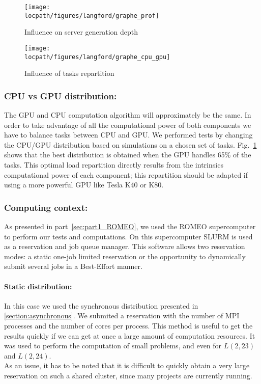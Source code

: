 \begin{figure}[htb]
\begin{minipage}[b]{0.5\linewidth}

\centering 
\texttt{[image: \\locpath/figures/langford/graphe\_prof]}
\caption{Influence on server generation depth}
\label{fig:graphe_prof}

\end{minipage}
\begin{minipage}[b]{0.5\linewidth}

\centering
\texttt{[image: \\locpath/figures/langford/graphe\_cpu\_gpu]}
\caption{Influence of tasks repartition}
\label{fig:graphe_rep}

\end{minipage}
\end{figure}

\subsubsection{CPU vs GPU distribution: }
The GPU and CPU computation algorithm will approximately be the same. 
In order to take advantage of all the computational power of both components we have to balance tasks between CPU and GPU. 
We performed tests by changing the CPU/GPU distribution based on simulations on a chosen set of tasks.  
Fig.~\ref{fig:graphe_rep} shows that the best distribution is obtained when the GPU handles 65\% of the tasks. 
This optimal load repartition directly results from the intrinsics computational power of each component; this repartition should be adapted if using a more powerful GPU like Tesla K40 or K80.

\subsubsection{Computing context: }

As presented in part~\ref{sec:part1_ROMEO}, we used the ROMEO supercomputer to perform our tests and computations.
On this supercomputer SLURM\cite{slurm} is used as a reservation and job queue manager.
This software allows two reservation modes: a static one-job limited reservation or the opportunity to dynamically submit several jobs in a Best-Effort manner.

\paragraph{Static distribution: }
In this case we used the synchronous distribution presented in \ref{section:asynchronous}. 
We submited a reservation with the number of MPI processes and the number of cores per process.
This method is useful to get the results quickly if we can get at once a large amount of computation resources. It was used to perform the computation of small problems, and even for $L(2,23)$ and $L(2,24)$.\\
As an issue, it has to be noted that it is difficult to quickly obtain a very large reservation on such a shared cluster, since many projects are currently running. 

